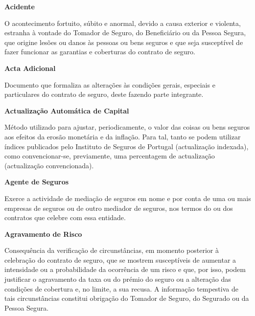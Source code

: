 \begin{description}
\item \textbf{Acidente}

O acontecimento fortuito, súbito e anormal, devido a causa exterior e violenta, estranha à vontade do Tomador de Seguro, do Beneficiário ou da Pessoa Segura, que origine lesões ou danos às pessoas ou bens seguros e que seja susceptível de fazer funcionar as garantias e coberturas do contrato de seguro.
\end{description}

\begin{description}
\item \textbf{Acta Adicional}

Documento que formaliza as alterações às condições gerais, especiais e particulares do contrato de seguro, deste fazendo parte integrante.
\end{description}

\begin{description}
\item \textbf{Actualização Automática de Capital}

Método utilizado para ajustar, periodicamente, o valor das coisas ou bens seguros aos efeitos da erosão monetária e da inflação. Para tal, tanto se podem utilizar índices publicados pelo Instituto de Seguros de Portugal (actualização indexada), como convencionar-se, previamente, uma percentagem de actualização (actualização convencionada).
\end{description}

\begin{description}
\item \textbf{Agente de Seguros}

Exerce a actividade de mediação de seguros em nome e por conta de uma ou mais empresas de seguros ou de outro mediador de seguros, nos termos do ou dos contratos que celebre com essa entidade.
\end{description}

\begin{description}
\item \textbf{Agravamento de Risco}

Consequência da verificação de circunstâncias, em momento posterior à celebração do contrato de seguro, que se mostrem susceptíveis de aumentar a intensidade ou a probabilidade da ocorrência de um risco e que, por isso, podem justificar o agravamento da taxa ou do prémio do seguro ou a alteração das condições de cobertura e, no limite, a sua recusa. A informação tempestiva de tais circunstâncias constitui obrigação do Tomador de Seguro, do Segurado ou da Pessoa Segura.
\end{description}

